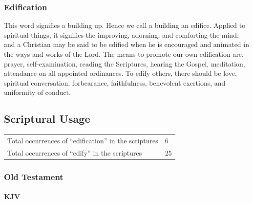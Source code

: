 	\subsubsection{Edification}

		\begin{compactdesc}
			\item[319] This word signifies a building up. Hence we call a building an edifice. Applied to spiritual things, it signifies the improving, adorning, and comforting the mind; and a Christian may be said to be edified when he is encouraged and animated in the ways and works of the Lord. The means to promote our own edification are, prayer, self-examination, reading the Scriptures, hearing the Gospel, meditation, attendance on all appointed ordinances. To edify others, there should be love, spiritual conversation, forbearance, faithfulness, benevolent exertions, and uniformity of conduct.
		\end{compactdesc}
	


\subsection{Scriptural Usage} %
	\label{EDIFICATION-SCRIPTURES}
	
	\begin{tabular}{ll}
		Total occurrences of ``edification'' in the scriptures & 6 \\
		Total occurrences of ``edify'' in the scriptures & 25
	\end{tabular}

	\subsubsection{Old Testament} %
		\label{EDIFICATION-OT}
	
		\paragraph{KJV}
			\label{EDIFICATION-OT-KJV}
			
